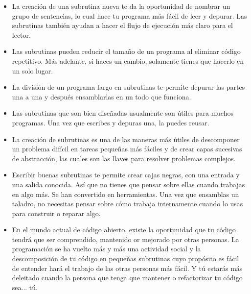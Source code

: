 \begin{itemize}

\item La creación de una subrutina nueva te da la oportunidad
de nombrar un grupo de sentencias, lo cual hace tu programa más
fácil de leer y depurar. Las subrutinas también ayudan a hacer el 
flujo de ejecución más claro para el lector.

\item Las subrutinas pueden reducir el tamaño de un programa
al eliminar código repetitivo. Más adelante, si haces un cambio,
solamente tienes que hacerlo en un solo lugar.

\item La división de un programa largo en subrutinas te permite
depurar las partes una a una y después ensamblarlas en un todo
que funciona.

\item Las subrutinas que son bien diseñadas usualmente son 
útiles para muchos programas. Una vez que escribes y depuras una,
la puedes reusar.

\item La creación de subrutinas es una de las maneras más
útiles de descomponer un problema difícil en tareas pequeñas 
más fáciles y de crear capas sucesivas de abstracción, las cuales
son las llaves para resolver problemas complejos.

\item Escribir buenas subrutinas te permite crear cajas negras,
con una entrada y una salida conocida. Así que no tienes que pensar
sobre ellas cuando trabajas en algo más. Se han convertido en
herramientas. Una vez que ensamblas un taladro, no necesitas 
pensar sobre cómo trabaja internamente cuando lo usas para construir
o reparar algo.

\item En el mundo actual de código abierto, existe la oportunidad
que tu código tendrá que ser comprendido, mantenido or mejorado por 
otras personas. La programación se ha vuelto más y más una actividad
social y la descomposición de tu código en pequeñas subrutinas cuyo
propósito es fácil de entender hará el trabajo de las otras personas
más fácil. Y tú estarás más deleitado cuando la persona que tenga
que mantener o refactorizar tu código sea... tú.  

\end{itemize}


